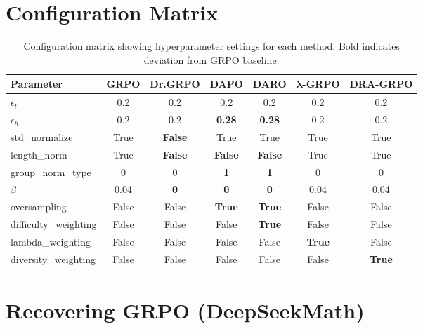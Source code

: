 \documentclass[11pt,a4paper]{article}
\begin{document}
\newpage

\section{Configuration Matrix}

\begin{table}[H]
\centering
\begin{tabular}{@{}lcccccc@{}}
\toprule
\textbf{Parameter} & \textbf{GRPO} & \textbf{Dr.GRPO} & \textbf{DAPO} & \textbf{DARO} & $\bm{\lambda}$\textbf{-GRPO} & \textbf{DRA-GRPO} \\
\midrule
$\epsilon_l$ & 0.2 & 0.2 & 0.2 & 0.2 & 0.2 & 0.2 \\
$\epsilon_h$ & 0.2 & 0.2 & \textbf{0.28} & \textbf{0.28} & 0.2 & 0.2 \\
std\_normalize & True & \textbf{False} & True & True & True & True \\
length\_norm & True & \textbf{False} & \textbf{False} & \textbf{False} & True & True \\
group\_norm\_type & 0 & 0 & \textbf{1} & \textbf{1} & 0 & 0 \\
$\beta$ & 0.04 & \textbf{0} & \textbf{0} & \textbf{0} & 0.04 & 0.04 \\
oversampling & False & False & \textbf{True} & \textbf{True} & False & False \\
difficulty\_weighting & False & False & False & \textbf{True} & False & False \\
lambda\_weighting & False & False & False & False & \textbf{True} & False \\
diversity\_weighting & False & False & False & False & False & \textbf{True} \\
\bottomrule
\end{tabular}
\caption{Configuration matrix showing hyperparameter settings for each method. Bold indicates deviation from GRPO baseline.}
\label{tab:config}
\end{table}

\newpage

\section{Recovering GRPO (DeepSeekMath)}
\end{document}
